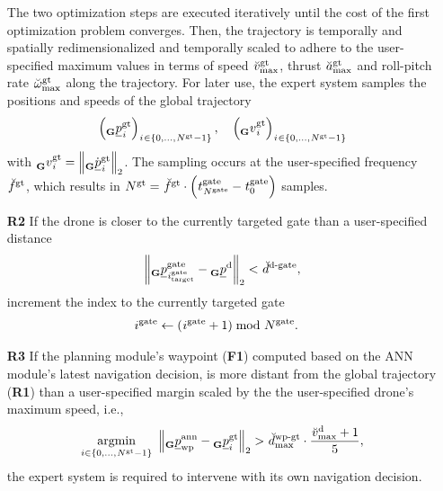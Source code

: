 \begin{itemize}
    
    
    The two optimization steps are executed iteratively until the cost
    of the first optimization problem converges. 
    Then, the trajectory is temporally and spatially redimensionalized
    and temporally scaled to adhere to 
    the user-specified maximum values in terms of 
    speed
    $\speed[\user]{\glotraj}{\mxm}{}{}$, 
    thrust 
    $\scacc[\user]{\glotraj}{\mxm}{}{}$
    and roll-pitch rate 
    $\scangvel[\user]{\glotraj}{\mxm}{}{}$
    along the trajectory. 
    For later use,
    the expert system samples the positions and speeds
    of the global trajectory
    \begin{equation}
        \left( 
            \pos[]{\glotraj}{\idx[]{}{}{}{}}{\grs}{}
        \right)
        _{\idx[]{}{}{}{} \in \left\{0, ..., \num[]{\glotraj}{}{}{} - 1 \right\}}
        ,\quad
        \left( 
            \speed[]{\glotraj}{\idx[]{}{}{}{}}{\grs}{}
        \right)
        _{\idx[]{}{}{}{} \in \left\{0, ..., \num[]{\glotraj}{}{}{} - 1 \right\}}
    \end{equation}
    with $\speed[]{\glotraj}{\idx[]{}{}{}{}}{\grs}{} = 
    \left\| 
        \pos[\dot]{\glotraj}{\idx[]{}{}{}{}}{\grs}{}
    \right\|_2 $.
    The sampling occurs at the
    user-specified frequency
    $\freq[\user]{\glotraj}{}{}{}$,
    which results in
    $\num[]{\glotraj}{}{}{} = \freq[\user]{\glotraj}{}{}{} \cdot 
    \left(\timepnt[]{\gate}{\num[]{\gate}{}{}{}}{}{}
    - \timepnt[]{\gate}{0}{}{}\right)$
    samples.

    
    \item [\textbf{R2}] If the drone is closer to the currently targeted gate 
    than a user-specified distance
    \begin{equation}
        \left\| 
            \pos[]{\gate}{\idx[]{\gate}{\target}{}{}}{\grs}{} - \pos[]{\drone}{}{\grs}{}
        \right\|_2 
        < 
        \dist[\user]{\dronetogate}{}{}{},
    \end{equation}
    increment the index to the currently targeted gate
    \begin{align}
        \idx[]{\gate}{}{}{} &\leftarrow (\idx[]{\gate}{}{}{} + 1) \bmod \num[]{\gate}{}{}{}.
    \end{align}
    
    \item [\textbf{R3}] If the
    planning module's waypoint (\textbf{F1}) computed based on the
    ANN module's latest navigation decision,
    is more distant from the global trajectory (\textbf{R1}) than
    a user-specified margin scaled by the 
    the user-specified drone's maximum speed, i.e.,
    \begin{equation}
        \argmin{i \in \{0, ..., \num[]{\glotraj}{}{}{} - 1\}}
            \left\| 
                \pos[]{\text{ann}}{\wayp}{\grs}{}
                - 
                \pos[]{\glotraj}{i}{\grs}{}
            \right\|_2
            >
            \dist[\user]{\wayptoglotraj}{\mxm}{}{} \cdot \frac{\speed[\user]{\drone}{\mxm}{}{} +1}{5},
    \end{equation}
    the expert system is required to intervene with its own navigation decision.


\end{itemize}
